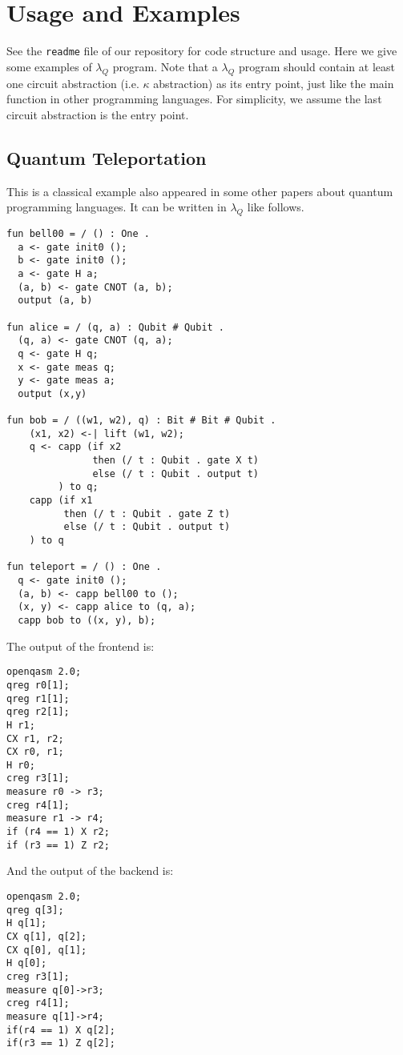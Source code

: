 \section{Usage and Examples}

See the \texttt{readme} file of our repository for code structure and usage.
Here we give some examples of $\lambda_Q$ program.
Note that a $\lambda_Q$ program should contain at least one circuit abstraction (i.e. $\kappa$ abstraction) as its entry point, just like the main function in other programming languages.
For simplicity, we assume the last circuit abstraction is the entry point.


\subsection{Quantum Teleportation}

This is a classical example also appeared in some other papers about quantum programming languages.
It can be written in $\lambda_Q$ like follows.

\begin{lstlisting}[language=Lambda]
fun bell00 = / () : One .
  a <- gate init0 ();
  b <- gate init0 ();
  a <- gate H a;
  (a, b) <- gate CNOT (a, b);
  output (a, b)

fun alice = / (q, a) : Qubit # Qubit .
  (q, a) <- gate CNOT (q, a);
  q <- gate H q;
  x <- gate meas q;
  y <- gate meas a;
  output (x,y)

fun bob = / ((w1, w2), q) : Bit # Bit # Qubit .
    (x1, x2) <-| lift (w1, w2);
    q <- capp (if x2
               then (/ t : Qubit . gate X t)
               else (/ t : Qubit . output t)
         ) to q;
    capp (if x1
          then (/ t : Qubit . gate Z t)
          else (/ t : Qubit . output t)
    ) to q

fun teleport = / () : One .
  q <- gate init0 ();
  (a, b) <- capp bell00 to ();
  (x, y) <- capp alice to (q, a);
  capp bob to ((x, y), b);
\end{lstlisting}

The output of the frontend is:
\begin{lstlisting}[language=lambda]
openqasm 2.0;
qreg r0[1];
qreg r1[1];
qreg r2[1];
H r1;
CX r1, r2;
CX r0, r1;
H r0;
creg r3[1];
measure r0 -> r3;
creg r4[1];
measure r1 -> r4;
if (r4 == 1) X r2;
if (r3 == 1) Z r2;
\end{lstlisting}

And the output of the backend is:
\begin{lstlisting}[language=lambda]
openqasm 2.0;
qreg q[3];
H q[1];
CX q[1], q[2];
CX q[0], q[1];
H q[0];
creg r3[1];
measure q[0]->r3;
creg r4[1];
measure q[1]->r4;
if(r4 == 1) X q[2];
if(r3 == 1) Z q[2];
\end{lstlisting}

